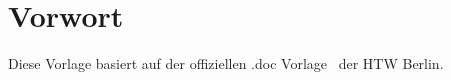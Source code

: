 \chapter{Vorwort}

Diese Vorlage basiert auf der offiziellen .doc Vorlage~\cite{vorlagen} der HTW Berlin.
